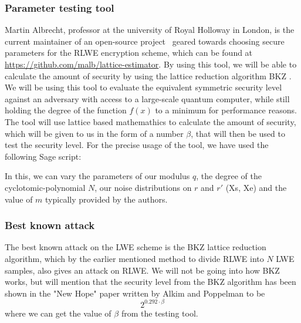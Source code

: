 \documentclass[../main.tex]{subfiles}
\begin{document}
    \subsubsection{Parameter testing tool} \label{sec:lattice-reduction}
        Martin Albrecht, professor at the university of Royal Holloway in London, is the current maintainer of an
		open-source project~\cite{cryptoeprint:2015:046} geared towards choosing secure parameters for the RLWE encryption scheme, which can be found at \url{https://github.com/malb/lattice-estimator}.
		By using this tool, we will be able to calculate the amount of security by using the lattice reduction algorithm BKZ \cite{alkim2016post}.
		We will be using this tool to evaluate the equivalent symmetric security level against an adversary with access to a large-scale quantum computer,
		while still holding the degree of the function $f(x)$ to a minimum for performance reasons.
		The tool will use lattice based mathemathics to calculate the amount of security, which will be given
		to us in the form of a number $\beta$, that will then be used to test the security level.
        For the precise usage of the tool, we have used the following Sage script:
        
        In this, we can vary the parameters of our modulus $q$, the degree of the cyclotomic-polynomial $N$,
        our noise distributions on $r$ and $r'$ (Xs, Xe) and the value of $m$ typically provided by the authors.

    \subsubsection{Best known attack}
		The best known attack on the LWE scheme is the BKZ lattice reduction algorithm, which by the earlier mentioned method to divide RLWE into $N$ LWE samples, also gives an attack on RLWE.
		We will not be going into how BKZ works, but will mention that the security level from the BKZ algorithm
		has been shown in the "New Hope" paper \cite{alkim2016post} written by Alkim and Poppelman to be
		\[ 2^{0.292 \cdot \beta} \]
		where we can get the value of $\beta$ from the testing tool.
\end{document}
